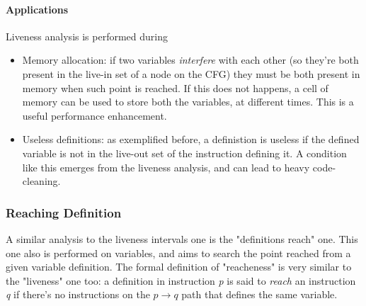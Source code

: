                     \paragraph{Applications}
                        Liveness analysis is performed during
                        \begin{itemize}
                            \item Memory allocation: if two variables \emph{interfere} with each other (so they're both present in the live-in set of a node on the CFG) they must be both present in memory when such point is reached. If this does not happens, a cell of memory can be used to store both the variables, at different times. This is a useful performance enhancement. 
                            \item Useless definitions: as exemplified before, a definistion is useless if the defined variable is not in the live-out set of the instruction defining it. A condition like this emerges from the liveness analysis, and can lead to heavy code-cleaning. 
                        \end{itemize}
                
                \subsubsection{Reaching Definition}
                    A similar analysis to the liveness intervals one is the "definitions reach" one. This one also is performed on variables, and aims to search the point reached from a given variable definition. The formal definition of "reacheness" is very similar to the "liveness" one too: a definition in instruction \emph{p} is said to \emph{reach} an instruction \emph{q} if there's no instructions on the $p \rightarrow q$ path that defines the same variable. 
                    
